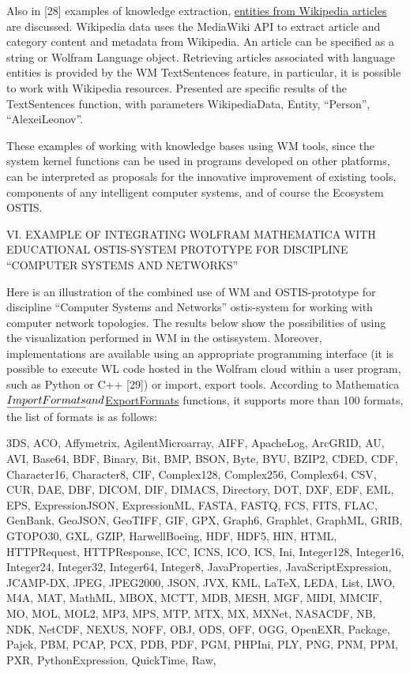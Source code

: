 \documentclass{article}
\begin{document}
\begin{multicols}{2}
Also in [28] examples of knowledge extraction,
\uline{entities from Wikipedia articles} are discussed. Wikipedia
data uses the MediaWiki API to extract article and category content and metadata from Wikipedia. An article
can be specified as a string or Wolfram Language object.
Retrieving articles associated with language entities is
provided by the WM TextSentences feature, in particular, it is possible to work with Wikipedia resources.
Presented are specific results of the TextSentences function, with parameters WikipediaData, Entity, “Person”,
“AlexeiLeonov”.

These examples of working with knowledge bases
using WM tools, since the system kernel functions can be
used in programs developed on other platforms, can be
interpreted as proposals for the innovative improvement
of existing tools, components of any intelligent computer
systems, and of course the Ecosystem OSTIS.

\begin{center}
VI. EXAMPLE OF INTEGRATING WOLFRAM
MATHEMATICA WITH EDUCATIONAL OSTIS-SYSTEM
PROTOTYPE FOR DISCIPLINE “COMPUTER SYSTEMS
AND NETWORKS”
\end{center}
Here is an illustration of the combined use of WM and
OSTIS-prototype for discipline “Computer Systems and
Networks” ostis-system for working with computer network topologies. The results below show the possibilities
of using the visualization performed in WM in the ostissystem. Moreover, implementations are available using
an appropriate programming interface (it is possible to
execute WL code hosted in the Wolfram cloud within a
user program, such as Python or C++ [29]) or import, export tools. According to Mathematica $\uline{ImportFormats}
and $\uline{ExportFormats} functions, it supports more than
100 formats, the list of formats is as follows:

3DS, ACO, Affymetrix, AgilentMicroarray, AIFF,
ApacheLog, ArcGRID, AU, AVI, Base64, BDF, Binary, Bit, BMP, BSON, Byte, BYU, BZIP2, CDED,
CDF, Character16, Character8, CIF, Complex128, Complex256, Complex64, CSV, CUR, DAE, DBF, DICOM,
DIF, DIMACS, Directory, DOT, DXF, EDF, EML,
EPS, ExpressionJSON, ExpressionML, FASTA, FASTQ,
FCS, FITS, FLAC, GenBank, GeoJSON, GeoTIFF, GIF,
GPX, Graph6, Graphlet, GraphML, GRIB, GTOPO30,
GXL, GZIP, HarwellBoeing, HDF, HDF5, HIN, HTML,
HTTPRequest, HTTPResponse, ICC, ICNS, ICO, ICS,
Ini, Integer128, Integer16, Integer24, Integer32, Integer64, Integer8, JavaProperties, JavaScriptExpression,
JCAMP-DX, JPEG, JPEG2000, JSON, JVX, KML, LaTeX, LEDA, List, LWO, M4A, MAT, MathML, MBOX,
MCTT, MDB, MESH, MGF, MIDI, MMCIF, MO,
MOL, MOL2, MP3, MPS, MTP, MTX, MX, MXNet,
NASACDF, NB, NDK, NetCDF, NEXUS, NOFF, OBJ,
ODS, OFF, OGG, OpenEXR, Package, Pajek, PBM,
PCAP, PCX, PDB, PDF, PGM, PHPIni, PLY, PNG,
PNM, PPM, PXR, PythonExpression, QuickTime, Raw,


\end{multicols}
\end{document}
